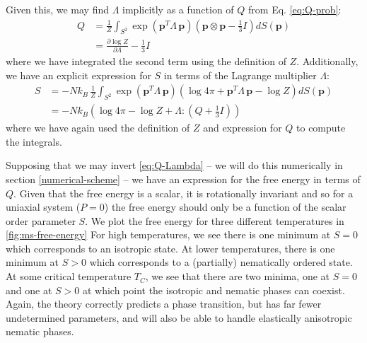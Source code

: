 \documentclass[reqno]{article}
\begin{document}
  Given this, we may find $\Lambda$ implicitly as a function of $Q$ from Eq.
  \eqref{eq:Q-prob}:
  \begin{equation} \label{eq:Q-Lambda}
    \begin{split}
      Q
      &=
      \frac{1}{Z} \int_{S^2} \exp(\mathbf{p}^T \Lambda \, \mathbf{p}) \left( \mathbf{p} \otimes \mathbf{p} - \tfrac13 I \right) dS(\mathbf{p}) \\
      &=
      \frac{\partial \log Z}{\partial \Lambda} - \frac13 I
    \end{split}
  \end{equation}
  where we have integrated the second term using the definition of $Z$.
  Additionally, we have an explicit expression for $S$ in terms
  of the Lagrange multiplier $\Lambda$:
  \begin{equation}
    \begin{split}
      S
      &=
      -N k_B \,
      \frac{1}{Z}
      \int_{S^2}
      \exp(\mathbf{p}^T \Lambda \, \mathbf{p}) \left( \log 4 \pi + \mathbf{p}^T \Lambda \, \mathbf{p} - \log Z \right) dS(\mathbf{p}) \\
      &=
      -N k_B \left(
        \log 4 \pi - \log Z + \Lambda : \left( Q + \tfrac13 I \right)
      \right)
    \end{split}
  \end{equation}
  where we have again used the definition of $Z$ and expression for $Q$ to
  compute the integrals.

  Supposing that we may invert \eqref{eq:Q-Lambda} -- we will do this
  numerically in section \ref{numerical-scheme} -- we have an expression for the
  free energy in terms of $Q$.
  Given that the free energy is a scalar, it is rotationally invariant and so
  for a uniaxial system ($P = 0$) the free energy should only be a function of
  the scalar order parameter $S$.
  We plot the free energy for three different temperatures in \ref{fig:ms-free-energy}
  For high temperatures, we see there is one minimum at $S = 0$ which
  corresponds to an isotropic state.
  At lower temperatures, there is one minimum at $S > 0$ which corresponds to a
  (partially) nematically ordered state.
  At some critical temperature $T_C$, we see that there are two minima, one at
  $S = 0$ and one at $S > 0$ at which point the isotropic and nematic phases can
  coexist.
  Again, the theory correctly predicts a phase transition, but has far fewer
  undetermined parameters, and will also be able to handle elastically
  anisotropic nematic phases.
\end{document}
